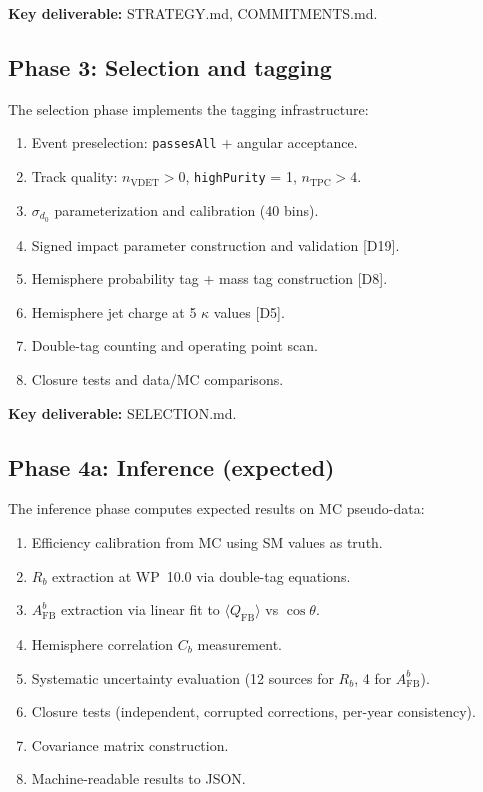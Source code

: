\documentclass[11pt,a4paper]{article}
\begin{document}
\textbf{Key deliverable:} STRATEGY.md, COMMITMENTS.md.

\subsection{Phase 3: Selection and tagging}

The selection phase implements the tagging infrastructure:
\begin{enumerate}
\item Event preselection: \texttt{passesAll} + angular acceptance.
\item Track quality: $n_\mathrm{VDET} > 0$, \texttt{highPurity} = 1, $n_\mathrm{TPC} > 4$.
\item $\sigma_{d_0}$ parameterization and calibration (40 bins).
\item Signed impact parameter construction and validation [D19].
\item Hemisphere probability tag + mass tag construction [D8].
\item Hemisphere jet charge at 5 $\kappa$ values [D5].
\item Double-tag counting and operating point scan.
\item Closure tests and data/MC comparisons.
\end{enumerate}

\textbf{Key deliverable:} SELECTION.md.

\subsection{Phase 4a: Inference (expected)}

The inference phase computes expected results on MC pseudo-data:
\begin{enumerate}
\item Efficiency calibration from MC using SM values as truth.
\item $R_b$ extraction at WP~10.0 via double-tag equations.
\item $A_\mathrm{FB}^b$ extraction via linear fit to $\langle Q_\mathrm{FB} \rangle$
vs $\cos\theta$.
\item Hemisphere correlation $C_b$ measurement.
\item Systematic uncertainty evaluation (12 sources for $R_b$, 4 for $A_\mathrm{FB}^b$).
\item Closure tests (independent, corrupted corrections, per-year consistency).
\item Covariance matrix construction.
\item Machine-readable results to JSON.
\end{enumerate}
\end{document}
